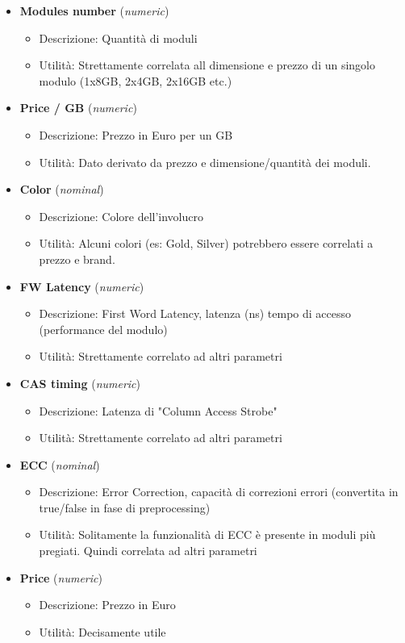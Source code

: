 \documentclass[12pt]{report}
\begin{document}
\begin{itemize}
\begin{itemize}
		\end{itemize}
	\item \textbf{Modules number} (\textit{numeric})
		\begin{itemize}
			\item Descrizione: Quantità di moduli
			\item Utilità: Strettamente correlata all dimensione e prezzo di un singolo modulo (1x8GB, 2x4GB, 2x16GB etc.)
		\end{itemize}
	\item \textbf{Price / GB} (\textit{numeric})
		\begin{itemize}
			\item Descrizione: Prezzo in Euro per un GB
			\item Utilità: Dato derivato da prezzo e dimensione/quantità dei moduli.
		\end{itemize}
	\item \textbf{Color} (\textit{nominal})
		\begin{itemize}
			\item Descrizione: Colore dell'involucro
			\item Utilità: Alcuni colori (es: Gold, Silver) potrebbero essere correlati a prezzo e brand.
		\end{itemize}
	\item \textbf{FW Latency} (\textit{numeric})
		\begin{itemize}
			\item Descrizione: First Word Latency, latenza (ns) tempo di accesso (performance del modulo)
			\item Utilità: Strettamente correlato ad altri parametri
		\end{itemize}
	\item \textbf{CAS timing} (\textit{numeric})
		\begin{itemize}
			\item Descrizione: Latenza di "Column Access Strobe"
			\item Utilità: Strettamente correlato ad altri parametri
		\end{itemize}
	\item \textbf{ECC} (\textit{nominal})
		\begin{itemize}
			\item Descrizione: Error Correction, capacità di correzioni errori (convertita in true/false in fase di preprocessing)
			\item Utilità: Solitamente la funzionalità di ECC è presente in moduli più pregiati. Quindi correlata ad altri parametri
		\end{itemize}
	\item \textbf{Price} (\textit{numeric})
		\begin{itemize}
			\item Descrizione: Prezzo in Euro
			\item Utilità: Decisamente utile
		\end{itemize}
\end{itemize}
\end{document}
